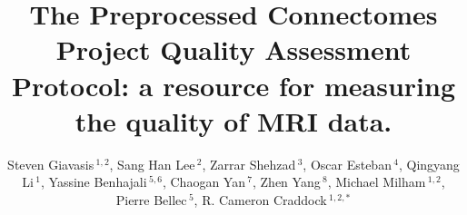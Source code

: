 \documentclass{frontiersSCNS} %
\def\firstAuthorLast{Giavasis {et~al.}} %
\def\Authors{Steven Giavasis\,$^{1,2}$,
        Sang Han Lee\,$^{2}$,
        Zarrar Shehzad\,$^{3}$,
        Oscar Esteban\,$^{4}$,
        Qingyang Li\,$^{1}$,
        Yassine Benhajali\,$^{5,6}$,
        Chaogan Yan\,$^{7}$,
        Zhen Yang\,$^{8}$,
        Michael Milham\,$^{1,2}$,
        Pierre Bellec\,$^{5}$,
        R. Cameron Craddock\,$^{1,2,*}$
}
\begin{document}
\onecolumn
{}

\title[Quality Assessment Protocol]{The Preprocessed Connectomes Project Quality Assessment Protocol: a resource for measuring the quality of MRI data.} 

\author[\firstAuthorLast ]{\Authors} %
\address{} %
\correspondance{} %

\extraAuth{}%

\maketitle

\end{document}
